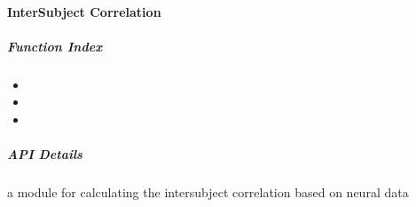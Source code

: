\documentclass[letterpaper,10pt,english]{sphinxhowto}
\begin{document}
\paragraph{Inter\sphinxhyphen{}Subject Correlation}
\label{\detokenize{isc_cal:inter-subject-correlation}}\label{\detokenize{isc_cal::doc}}
\sphinxAtStartPar
{}


\subparagraph{Function Index}
\label{\detokenize{isc_cal:function-index}}\begin{itemize}
\item {} 
\sphinxAtStartPar
{}

\item {} 
\sphinxAtStartPar
{}

\item {} 
\sphinxAtStartPar
{}

\end{itemize}


\subparagraph{API Details}
\label{\detokenize{isc_cal:module-neurora.isc_cal}}\label{\detokenize{isc_cal:api-details}}
\sphinxAtStartPar
a module for calculating the inter\sphinxhyphen{}subject correlation based on neural data
\end{document}

